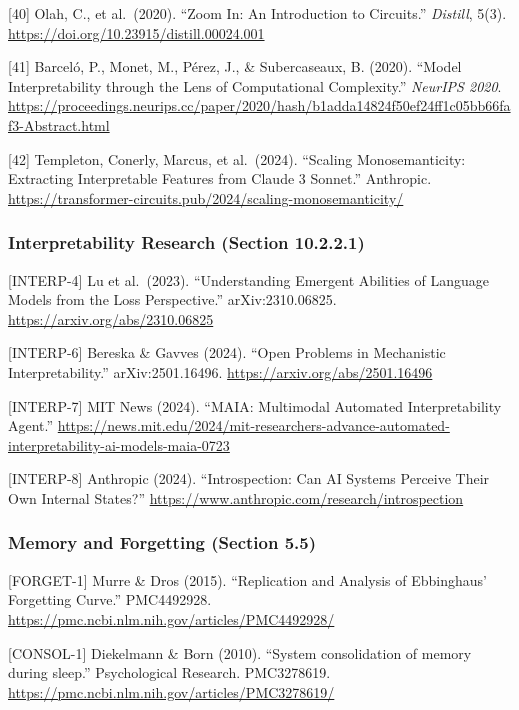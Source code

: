 \documentclass[
  11pt,
]{article}
\begin{document}
{[}40{]} Olah, C., et al.~(2020). ``Zoom In: An Introduction to
Circuits.'' \emph{Distill}, 5(3).
\url{https://doi.org/10.23915/distill.00024.001}

{[}41{]} Barceló, P., Monet, M., Pérez, J., \& Subercaseaux, B. (2020).
``Model Interpretability through the Lens of Computational Complexity.''
\emph{NeurIPS 2020}.
\url{https://proceedings.neurips.cc/paper/2020/hash/b1adda14824f50ef24ff1c05bb66faf3-Abstract.html}

{[}42{]} Templeton, Conerly, Marcus, et al.~(2024). ``Scaling
Monosemanticity: Extracting Interpretable Features from Claude 3
Sonnet.'' Anthropic.
\url{https://transformer-circuits.pub/2024/scaling-monosemanticity/}

\subsubsection{Interpretability Research (Section
10.2.2.1)}\label{interpretability-research-section-10.2.2.1}

{[}INTERP-4{]} Lu et al.~(2023). ``Understanding Emergent Abilities of
Language Models from the Loss Perspective.'' arXiv:2310.06825.
\url{https://arxiv.org/abs/2310.06825}

{[}INTERP-6{]} Bereska \& Gavves (2024). ``Open Problems in Mechanistic
Interpretability.'' arXiv:2501.16496.
\url{https://arxiv.org/abs/2501.16496}

{[}INTERP-7{]} MIT News (2024). ``MAIA: Multimodal Automated
Interpretability Agent.''
\url{https://news.mit.edu/2024/mit-researchers-advance-automated-interpretability-ai-models-maia-0723}

{[}INTERP-8{]} Anthropic (2024). ``Introspection: Can AI Systems
Perceive Their Own Internal States?''
\url{https://www.anthropic.com/research/introspection}

\subsubsection{Memory and Forgetting (Section
5.5)}\label{memory-and-forgetting-section-5.5}

{[}FORGET-1{]} Murre \& Dros (2015). ``Replication and Analysis of
Ebbinghaus' Forgetting Curve.'' PMC4492928.
\url{https://pmc.ncbi.nlm.nih.gov/articles/PMC4492928/}

{[}CONSOL-1{]} Diekelmann \& Born (2010). ``System consolidation of
memory during sleep.'' Psychological Research. PMC3278619.
\url{https://pmc.ncbi.nlm.nih.gov/articles/PMC3278619/}
\end{document}
